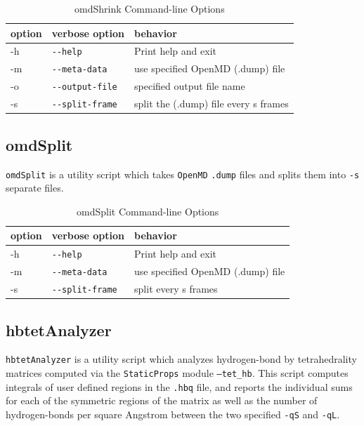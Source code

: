 \documentclass[]{book}
\begin{document}
\begin{longtable}[c]{|EFG|}
\caption{omdShrink Command-line Options}
\\ \hline
{\bf option} & {\bf verbose option} & {\bf behavior} \\ \hline
\endhead
\hline
\endfoot
  -h& {\tt -{}-help}               & Print help and exit\\
  -m& {\tt -{}-meta-data}          & use specified OpenMD (.dump) file \\
  -o& {\tt -{}-output-file}        & specified output file name \\
  -s& {\tt -{}-split-frame}        & split the (.dump) file every s frames \\
\end{longtable}

\subsection{\label{section:omdSplit}omdSplit}
{\tt omdSplit} is a utility script which takes {\tt OpenMD} {\tt .dump}
files and splits them into {\tt -s} separate files.

\begin{longtable}[c]{|EFG|}
\caption{omdSplit Command-line Options}
\\ \hline
{\bf option} & {\bf verbose option} & {\bf behavior} \\ \hline
\endhead
\hline
\endfoot
  -h& {\tt -{}-help}               & Print help and exit\\
  -m& {\tt -{}-meta-data}          & use specified OpenMD (.dump) file \\
  -s& {\tt -{}-split-frame}        & split every s frames \\
\end{longtable}



\subsection{\label{section:hbtetAnalyzer}hbtetAnalyzer}
{\tt hbtetAnalyzer} is a utility script which analyzes hydrogen-bond
by tetrahedrality matrices computed via the {\tt StaticProps} module
{\tt --tet\_hb}. This script computes integrals of user defined
regions in the {\tt .hbq} file, and reports the individual sums for
each of the symmetric regions of the matrix as well as the number of
hydrogen-bonds per square Angstrom between the two specified {\tt -qS}
and {\tt -qL}.
\end{document}
